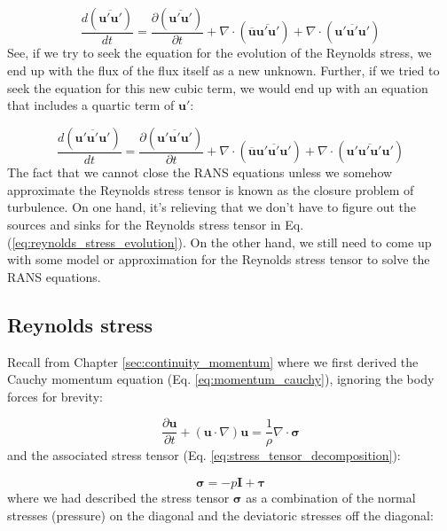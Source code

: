 \documentclass[12pt]{article}
\numberwithin{equation}{section}
\numberwithin{figure}{section}
\numberwithin{table}{section}
\begin{document}
\begin{equation}
  \frac{d \left( \overline{\mathbf{u}' \mathbf{u}'} \right)}{dt} =
  \frac{\partial \left( \overline{\mathbf{u}' \mathbf{u}'} \right)}{\partial t} +
  \nabla \cdot \left( \overline{\mathbf{u}} \overline{\mathbf{u}' \mathbf{u}'} \right) +
  \nabla \cdot \left( \overline{\mathbf{u}' \mathbf{u}' \mathbf{u}'} \right)
\end{equation}
See, if we try to seek the equation for the evolution of the Reynolds stress,
we end up with the flux of the flux itself as a new unknown.
Further, if we tried to seek the equation for this new cubic term, we would
end up with an equation that includes a quartic term of $\mathbf{u}'$:


\begin{equation}
  \frac{d \left( \overline{\mathbf{u}' \mathbf{u}' \mathbf{u}'} \right)}{dt} =
  \frac{\partial \left( \overline{\mathbf{u}' \mathbf{u}' \mathbf{u}'} \right)}{\partial t} +
  \nabla \cdot \left( \overline{\mathbf{u}} \overline{\mathbf{u}' \mathbf{u}' \mathbf{u}'} \right) +
  \nabla \cdot \left( \overline{\mathbf{u}' \mathbf{u}' \mathbf{u}' \mathbf{u}'} \right)
\end{equation}
The fact that we cannot close the RANS equations unless we somehow approximate
the Reynolds stress tensor is known as the closure problem of turbulence.
On one hand, it's relieving that we don't have to figure out the sources and
sinks for the Reynolds stress tensor in Eq. (\ref{eq:reynolds_stress_evolution}).
On the other hand, we still need to come up with some model or approximation
for the Reynolds stress tensor to solve the RANS equations.

\subsection{Reynolds stress}

Recall from Chapter \ref{sec:continuity_momentum} where we first derived the
Cauchy momentum equation (Eq. \ref{eq:momentum_cauchy}), ignoring the body forces
for brevity:

\begin{equation}
  \frac{\partial \mathbf{u}}{\partial t} + (\mathbf{u} \cdot \nabla) \mathbf{u} =
  \frac{1}{\rho} \nabla \cdot \boldsymbol{\sigma}
\end{equation}
and the associated stress tensor (Eq. \ref{eq:stress_tensor_decomposition}):

\begin{equation}
  \boldsymbol{\sigma} = -p \mathbf{I} + \boldsymbol{\tau}
\end{equation}
where we had described the stress tensor $\boldsymbol{\sigma}$ as a combination
of the normal stresses (pressure) on the diagonal and the deviatoric stresses
off the diagonal:
\end{document}

